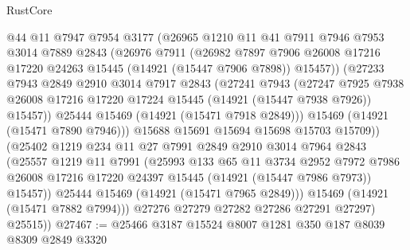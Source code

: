 \begin{lexlean}{RustCore}
\begin{coremodule}
                @44
                @11
                @7947
                @7954
                @3177
                (@26965
                  @1210
                  @11
                  @41
                  @7911
                  @7946
                  @7953
                  @3014
                  @7889
                  @2843
                  (@26976
                    @7911
                    (@26982
                      @7897
                      @7906
                      @26008
                      @17216
                      @17220
                      @24263
                      @15445
                      (@14921 (@15447 @7906 @7898))
                      @15457))
                  (@27233
                    @7943
                    @2849
                    @2910
                    @3014
                    @7917
                    @2843
                    (@27241
                      @7943
                      (@27247
                        @7925
                        @7938
                        @26008
                        @17216
                        @17220
                        @17224
                        @15445
                        (@14921 (@15447 @7938 @7926))
                        @15457))
                    @25444
                    @15469
                    (@14921 (@15471 @7918 @2849)))
                  @15469
                  (@14921 (@15471 @7890 @7946)))
                @15688
                @15691
                @15694
                @15698
                @15703
                @15709))
            (@25402
              @1219
              @234
              @11
              @27
              @7991
              @2849
              @2910
              @3014
              @7964
              @2843
              (@25557
                @1219
                @11
                @7991
                (@25993
                  @133
                  @65
                  @11
                  @3734
                  @2952
                  @7972
                  @7986
                  @26008
                  @17216
                  @17220
                  @24397
                  @15445
                  (@14921 (@15447 @7986 @7973))
                  @15457))
              @25444
              @15469
              (@14921 (@15471 @7965 @2849)))
            @15469
            (@14921 (@15471 @7882 @7994)))
          @27276
          @27279
          @27282
          @27286
          @27291
          @27297)
        @25515))
@27467 := @25466 @3187 @15524 @8007 @1281 @350 @187 @8039 @8309 @2849 @3320

\end{coremodule}
\end{lexlean}
